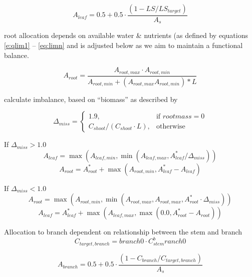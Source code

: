 \begin{equation}
	A_{leaf} = 0.5 + 0.5 \cdot \dfrac{(1-LS/LS_{target})}{A_{s}}
	\label{AleafAllometric}
\end{equation}

root allocation depends on available water \& nutrients (as defined by equations \ref{e:qlim1} -- \ref{eq:limn} and is adjusted below as we aim to maintain a functional balance.

\begin{equation}
	A_{root} = \dfrac{A_{root,max} \cdot A_{root,min}}{A_{root,min} + (A_{root,max} A_{root,min})*L}
\end{equation}

calculate imbalance, based on ``biomass'' as described by \citet{sitch2003}

\begin{equation}
	\Delta_{miss}=
	\begin{cases}
	    1.9,& \text{if } root mass = 0 \\
	    C_{shoot}/(C_{shoot} \cdot L),& \text{otherwise}
	\end{cases}
\end{equation}

If $\Delta_{miss} > 1.0$ 
\begin{equation}
	A_{leaf} = \max (A_{leaf,min}, \min (A_{leaf,max}, A_{leaf}^* / \Delta_{miss}))
\end{equation}
\begin{equation}
	A_{root} = A_{root}^* + \max (A_{root,min}, A_{leaf}^* - A_{leaf})
\end{equation}

If $\Delta_{miss} < 1.0$ 
\begin{equation}
	A_{root} = \max (A_{root,min}, \min (A_{root,max},A_{root,max}, A_{root}^* \cdot \Delta_{miss}))
\end{equation}
\begin{equation}
	A_{leaf} = A_{leaf}^* + \max (A_{leaf,max}, \max(0.0, A_{root}^* - A_{root}))
\end{equation}


Allocation to branch dependent on relationship between the stem and branch
\begin{equation}
	C_{target,branch} = branch0 \cdot C_{stem}^branch0
\end{equation}

\begin{equation}
	A_{branch} = 0.5 + 0.5 \cdot \dfrac{(1-C_{branch}/C_{target,branch})}{A_{s}}
\end{equation}

